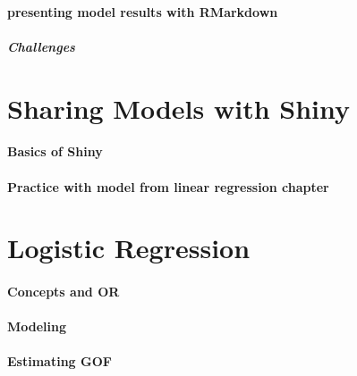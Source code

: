 \documentclass[
]{book}
\begin{document}
\hypertarget{presenting-model-results-with-rmarkdown}{%
\subsubsection{presenting model results with RMarkdown}\label{presenting-model-results-with-rmarkdown}}

\hypertarget{challenges-12}{%
\paragraph{Challenges}\label{challenges-12}}

\hypertarget{sharing-models-with-shiny}{%
\chapter{Sharing Models with Shiny}\label{sharing-models-with-shiny}}

\hypertarget{basics-of-shiny}{%
\subsubsection{Basics of Shiny}\label{basics-of-shiny}}

\hypertarget{practice-with-model-from-linear-regression-chapter}{%
\subsubsection{Practice with model from linear regression chapter}\label{practice-with-model-from-linear-regression-chapter}}

\hypertarget{logistic-regression}{%
\chapter{Logistic Regression}\label{logistic-regression}}

\hypertarget{concepts-and-or}{%
\subsubsection{Concepts and OR}\label{concepts-and-or}}

\hypertarget{modeling}{%
\subsubsection{Modeling}\label{modeling}}

\hypertarget{estimating-gof}{%
\subsubsection{Estimating GOF}\label{estimating-gof}}
\end{document}
